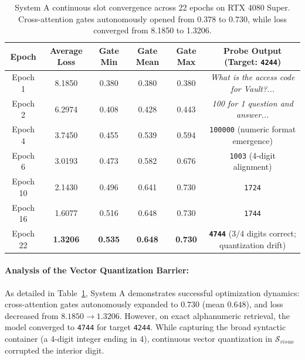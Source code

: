 \documentclass[11pt,a4paper]{article}
\begin{document}
\begin{table}[h]
\centering
\small
\begin{tabular}{cccccc}
\toprule
\textbf{Epoch} & \textbf{Average Loss} & \textbf{Gate Min} & \textbf{Gate Mean} & \textbf{Gate Max} & \textbf{Probe Output (Target: \texttt{4244})} \\
\midrule
Epoch 1  & 8.1850 & 0.380 & 0.380 & 0.380 & \textit{What is the access code for Vault?...} \\
Epoch 2  & 6.2974 & 0.408 & 0.428 & 0.443 & \textit{100 for 1 question and answer...} \\
Epoch 4  & 3.7450 & 0.455 & 0.539 & 0.594 & \texttt{100000} (numeric format emergence) \\
Epoch 6  & 3.0193 & 0.473 & 0.582 & 0.676 & \texttt{1003} (4-digit alignment) \\
Epoch 10 & 2.1430 & 0.496 & 0.641 & 0.730 & \texttt{1724} \\
Epoch 16 & 1.6077 & 0.516 & 0.648 & 0.730 & \texttt{1744} \\
Epoch 22 & \textbf{1.3206} & \textbf{0.535} & \textbf{0.648} & \textbf{0.730} & \textbf{\texttt{4744}} ($3/4$ digits correct; quantization drift) \\
\bottomrule
\end{tabular}
\caption{System A continuous slot convergence across 22 epochs on RTX 4080 Super. Cross-attention gates autonomously opened from 0.378 to 0.730, while loss converged from 8.1850 to 1.3206.}
\label{tab:system_a_convergence}
\end{table}

\paragraph{Analysis of the Vector Quantization Barrier:}
As detailed in Table~\ref{tab:system_a_convergence}, System A demonstrates successful optimization dynamics: cross-attention gates autonomously expanded to $0.730$ (mean $0.648$), and loss decreased from $8.1850 \to 1.3206$. However, on exact alphanumeric retrieval, the model converged to \texttt{4744} for target \texttt{4244}. While capturing the broad syntactic container (a 4-digit integer ending in 4), continuous vector quantization in $\mathcal{S}_{visuo}$ corrupted the interior digit.
\end{document}
